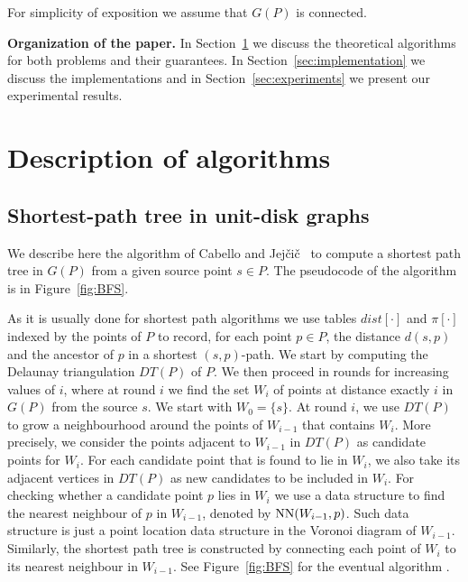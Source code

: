\documentclass[a4paper,USenglish,numberwithinsect]{lipics}
\def\dist{\mathit{dist}}
\def\myparagraph#1{\medskip\noindent\textbf{#1.}}
\begin{document}
For simplicity of exposition we assume that $G(P)$ is connected.

\myparagraph{Organization of the paper} 
In Section~\ref{sec:algorithms} we discuss the theoretical
algorithms for both problems and their guarantees.
In Section~\ref{sec:implementation} we discuss the implementations 
and in Section~\ref{sec:experiments} we present our experimental results.

\section{Description of algorithms}
\label{sec:algorithms}

\subsection{Shortest-path tree in unit-disk graphs}
\label{sec:algorithm-sptree}
We describe here the algorithm of Cabello and Jej\v{c}i\v{c}~\cite{CJ15} 
to compute a shortest path tree in $G(P)$ from a given source point $s\in P$. 
The pseudocode of the algorithm is in Figure~\ref{fig:BFS}. 

As it is usually done for shortest path algorithms 
we use tables $\dist[\cdot]$ and $\pi[\cdot]$ indexed by the points of $P$ to record, 
for each point $p\in P$, the distance $d(s,p)$ and the ancestor of $p$ 
in a shortest $(s,p)$-path. 
We start by computing the Delaunay triangulation $DT(P)$ of $P$. 
We then proceed in rounds for increasing values of $i$, 
where at round $i$ we find the set $W_i$ of points at distance exactly $i$ in $G(P)$ from the source $s$. We start with $W_0=\{ s\}$. 
At round $i$, we use $DT(P)$ to grow a neighbourhood around the points of $W_{i-1}$ 
that contains $W_{i}$. 
More precisely, we consider the points adjacent to $W_{i-1}$ in $DT(P)$ as candidate points for $W_{i}$. For each candidate point that is found to lie in $W_{i}$, we also take its adjacent vertices in $DT(P)$ as new candidates to be included in $W_{i}$. For checking whether a candidate point $p$ lies in $W_{i}$ we use a data structure to find the nearest neighbour of $p$ in $W_{i-1}$, denoted by $\func{NN}(W_{i-1},p)$. Such data structure is just a point location data structure in the Voronoi diagram of $W_{i-1}$. Similarly, the shortest path tree is constructed by connecting each point of $W_i$ to its nearest neighbour in $W_{i-1}$. See Figure~\ref{fig:BFS} for the eventual algorithm . 
\end{document}
